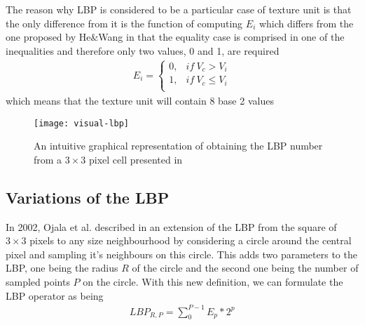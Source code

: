 The reason why LBP is considered to be a particular case of texture unit is that the only difference from it is the function of computing $E_i$ which differs from the one proposed by He\&Wang in that the equality case is comprised in one of the inequalities and therefore only two values, 0 and 1, are required
\begin{align}
E_i = \begin{cases}
0, & if\ V_c > V_i \\
1, & if\ V_c \leq V_i \\
\end{cases}
\end{align}
which means that the texture unit will contain 8 base 2 values

\begin{figure}[h]
	\begin{center}
		\texttt{[image: visual-lbp]}
	\end{center}
	\caption[Visual representation of \textbf{LBP} computation]{An intuitive graphical representation of obtaining the LBP number from a $3\times3$ pixel cell presented in \cite{lu2014divided}}
\end{figure}

\subsection{Variations of the LBP}
In 2002, Ojala et al. described in \cite{OjalaPM02} an extension of the LBP from the square of $3\times3$ pixels to any size neighbourhood by considering a circle around the central pixel and sampling it's neighbours on this circle. This adds two parameters to the LBP, one being the radius $R$ of the circle and the second one being the number of sampled points $P$ on the circle.  With this new definition, we can formulate the LBP operator as being
\begin{align}
	LBP_{R,P} = \sum_{0}^{P-1}E_p*2^p
\end{align}

